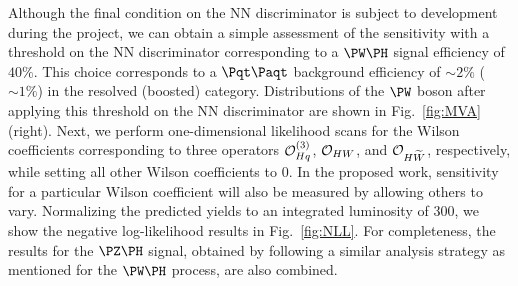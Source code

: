\documentclass[a4paper,11pt]{article}
\newcommand{\Pt}{{{\Pqt}}\xspace}
\newcommand{\PAt}{{{{\Paqt}}}\xspace}
\begin{document}
Although the final condition on the NN discriminator is subject to development during the project, 
we can obtain a simple assessment of the sensitivity with a threshold on the NN discriminator corresponding to a $\PW\PH$ signal efficiency of $40\%$.
This choice corresponds to a $\Pt\PAt$ background efficiency of $\sim 2\%$ ($\sim 1\%$) in the resolved (boosted) category.
Distributions of the $\PW$ boson \pt after applying this threshold on the NN discriminator are shown in Fig.~\ref{fig:MVA} (right). 
Next, we perform one-dimensional likelihood scans for the Wilson coefficients corresponding to three operators ${\cal O}^{(3)}_{Hq}$, ${\cal O}_{HW}$, and ${\cal O}_{H\widetilde{W}}$, respectively, while setting all other Wilson coefficients to $0$. 
In the proposed work, sensitivity for a particular Wilson coefficient will also be measured by allowing others to vary.
Normalizing the predicted yields to an integrated luminosity of 300\fbinv, we show the negative log-likelihood results in Fig.~\ref{fig:NLL}.
For completeness, the results for the $\PZ\PH$ signal, obtained by following a similar analysis strategy as mentioned for the $\PW\PH$ process, are also combined. 
\end{document}
